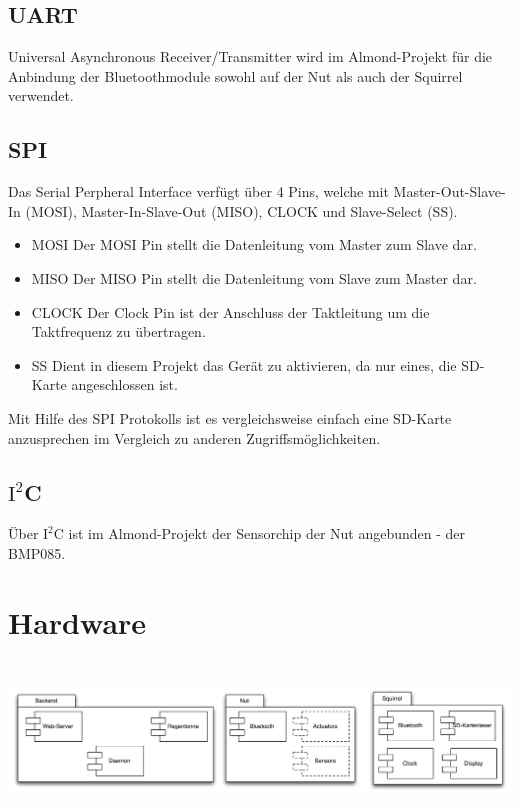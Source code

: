 \documentclass[12pt,a4paper]{article}
\begin{document}
	\subsection{UART}
Universal Asynchronous Receiver/Transmitter wird im Almond-Projekt für die Anbindung der Bluetoothmodule sowohl auf der Nut als auch der Squirrel verwendet.


	\subsection{SPI}
Das Serial Perpheral Interface verfügt über 4 Pins, welche mit Master-Out-Slave-In (MOSI), Master-In-Slave-Out (MISO), CLOCK und Slave-Select (SS).
\begin{itemize}
\item MOSI
Der MOSI Pin stellt die Datenleitung vom Master zum Slave dar.
\item MISO
Der MISO Pin stellt die Datenleitung vom Slave zum Master dar.
\item CLOCK
Der Clock Pin ist der Anschluss der Taktleitung um die Taktfrequenz zu übertragen.
\item SS
Dient in diesem Projekt das Gerät zu aktivieren, da nur eines, die SD-Karte angeschlossen ist.
\end{itemize}
Mit Hilfe des SPI Protokolls ist es vergleichsweise einfach eine SD-Karte anzusprechen im Vergleich zu anderen Zugriffsmöglichkeiten.

\subsection{$\text{I}^2$C}
Über $\text{I}^2$C ist im Almond-Projekt der Sensorchip der Nut angebunden - der BMP085.



\section{Hardware}

\includegraphics[height=4.2cm]{./Deployment.pdf}
\end{document}
